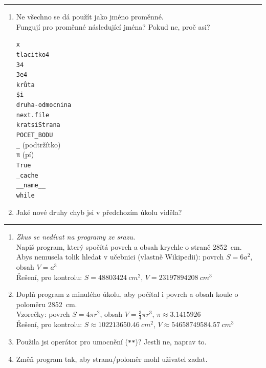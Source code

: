 \documentclass[a4paper,10pt]{article}
\begin{document}
\hrule

\begin{enumerate}[resume]
\item Ne všechno se dá použít jako jméno proměnné.
    \\Fungují pro proměnné následující jména? Pokud ne, proč asi?
    {
        \newcommand\varname[2][]{\varnameend[#1]{#2}\\[0.5cm]}
        \newcommand\varnameend[2][]{\texttt{#2} #1}
        \begin{multicols}{4}
        \varname{x}
        \varname{tlacitko4}
        \varname{34}
        \varname{3e4}
        \varname{krůta}
        \varname{\$i}
        \varname{druha-odmocnina}
        \varname{next.file}
        \varname{kratsiStrana}
        \varname{POCET\_BODU}
        \varname[(podtržítko)]{\_}
        \varname[(pí)]{\textrm{π}}
        \varname{True}
        \varname{\_cache}
        \varname{\_\_name\_\_}
        \varnameend{while}
        \end{multicols}
    }
    \hspace{0.5cm}
\item Jaké nové druhy chyb jsi v předchozím úkolu viděla?

\end{enumerate}

\hrule

\begin{enumerate}[resume]

\item \emph{\small Zkus se nedívat na programy ze srazu.}
    \\Napiš program, který spočítá povrch a obsah krychle o straně \SI{2852}{cm}.
    \\Abys nemusela tolik hledat v učebnici (vlastně Wikipedii): povrch $S=6a^2$, obsah $V=a^3$
    \\Řešení, pro kontrolu: $S=\SI{48803424}{cm^2}$, $V=\SI{23197894208}{cm^3}$

\item Doplň program z minulého úkolu, aby počítal i povrch a obsah koule o poloměru \SI{2852}{cm}.
    \\Vzorečky: povrch $S=4\pi r^2$, obsah $V=\frac34\pi r^3$, $\pi \approx 3.1415926$
    \\Řešení, pro kontrolu: $S\approx\SI{102213650,46}{cm^2}$, $V\approx\SI{54658749584,57}{cm^3}$

\item Použila jsi operátor pro umocnění (\texttt{**})? Jestli ne, naprav to.

\item Změň program tak, aby stranu/poloměr mohl uživatel zadat.

\end{enumerate}
\end{document}

